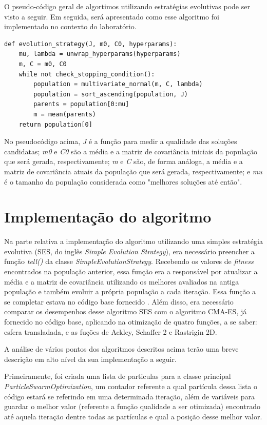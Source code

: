\documentclass[conference]{IEEEtran}
\begin{document}
O pseudo-código geral de algortimos utilizando estratégias evolutivas pode ser visto a seguir. Em seguida, será apresentado como esse algoritmo foi implementado no contexto do laboratório.

\begin{lstlisting}
def evolution_strategy(J, m0, C0, hyperparams):
	mu, lambda = unwrap_hyperparams(hyperparams)
	m, C = m0, C0
	while not check_stopping_condition():
		population = multivariate_normal(m, C, lambda)
		population = sort_ascending(population, J)
		parents = population[0:mu]
		m = mean(parents)
	return population[0]
\end{lstlisting}

No pseudocódigo acima, \textit{J} é a função para medir a qualidade das soluções candidatas; \textit{m0} e \textit{C0} são a média e a matriz de covariância iniciais da população que será gerada, respectivamente; \textit{m} e \textit{C} são, de forma análoga, a média e a matriz de covariância atuais da população que será gerada, respectivamente; e \textit{mu} é o tamanho da população considerada como "melhores soluções até então".

\section{Implementação do algoritmo}
Na parte relativa a implementação do algoritmo utilizando uma simples estratégia evolutiva (SES, do inglês \textit{Simple Evolution Strategy}), era necessário preencher a função \textit{tell()} da classe \textit{SimpleEvolutionStrategy}. Recebendo os valores de \textit{fitness} encontrados na população anterior, essa função era a responsável por atualizar a média e a matriz de covariância utilizando os melhores avaliados na antiga população e também evoluir a própria população a cada iteração. Essa função a se completar estava no código base fornecido \cite{b1}.  Além disso, era necessário comparar os desempenhos desse algoritmo SES com o algoritmo CMA-ES, já fornecido no código base, aplicando na otimização de quatro funções, a se saber: esfera transladada, e as fuções de Ackley, Schaffer 2 e Rastrigin 2D.

A análise de vários pontos dos algoritmos descritos acima terão uma breve descrição em alto nível da sua implementação a seguir. 

Primeiramente, foi criada uma lista de particulas para a classe principal \textit{ParticleSwarmOptimization}, um contador referente a qual partícula dessa lista o código estará se referindo em uma determinada iteração, além de variáveis para guardar o melhor valor (referente a função qualidade a ser otimizada) encontrado até aquela iteração dentre todas as partículas e qual a posição desse melhor valor.
\end{document}
